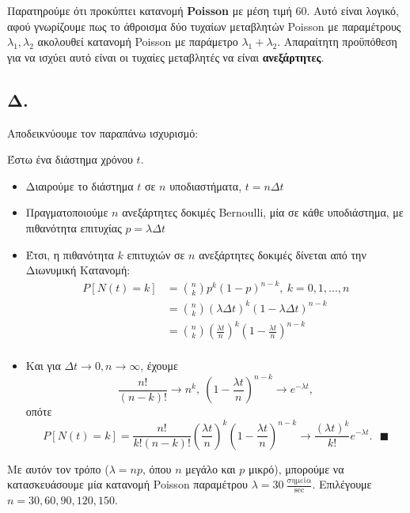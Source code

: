\documentclass[a4paper]{article}
\begin{document}
Παρατηρούμε ότι προκύπτει κατανομή \textbf{Poisson} με μέση τιμή 60. Αυτό είναι λογικό, αφού γνωρίζουμε πως το άθροισμα δύο τυχαίων μεταβλητών Poisson με παραμέτρους $ {λ_1, λ_2} $ ακολουθεί κατανομή Poisson με παράμετρο $ {λ_1 + λ_2} $. Απαραίτητη προϋπόθεση για να ισχύει αυτό είναι οι τυχαίες μεταβλητές να είναι \textbf{ανεξάρτητες}.

\subsection*{Δ.}

Αποδεικνύουμε τον παραπάνω ισχυρισμό:

Έστω ένα διάστημα χρόνου $ t $.

\begin{itemize}
	\item Διαιρούμε το διάστημα $ t $ σε $ n $ υποδιαστήματα, $ {t = nΔt} $
	\item Πραγματοποιούμε $ n $ ανεξάρτητες δοκιμές Bernoulli, μία σε κάθε υποδιάστημα, με πιθανότητα επιτυχίας $ {p = λΔt} $
	\item Έτσι, η πιθανότητα $ k $ επιτυχιών σε $ n $ ανεξάρτητες δοκιμές δίνεται από την Διωνυμική Κατανομή:
	\begin{align*}
		P[N(t) = k] &= \binom{n}{k}p^k(1-p)^{n-k}, \ k = 0,1,...,n \\
						&= \binom{n}{k}(λΔt)^k(1-λΔt)^{n-k} \\
						&= \binom{n}{k}\left(\frac{λt}{n}\right)^k\left(1-\frac{λt}{n} \right)^{n-k} \\			
	\end{align*}
	\item Και για $ Δt \to 0, n \to \infty $, έχουμε 
	\[
		\frac{n!}{(n-k)!} \to n^k, \ \left( 1-\frac{λt}{n}\right)^{n-k} \to e^{-λt},
	\]
	οπότε 
	\[
		P[N(t)=k] = \frac{n!}{k!(n-k)!}\left( \frac{λt}{n}\right)^k \left(1-\frac{λt}{n}\right)^{n-k} \to \frac{(λt)^k}{k!}e^{-λt}. \ \ \ \blacksquare
	\]
\end{itemize} 

Με αυτόν τον τρόπο ($ λ = np $, όπου $ n $ μεγάλο και $ p $ μικρό), μπορούμε να κατασκευάσουμε μία κατανομή Poisson παραμέτρου $ λ = 30 \ \frac{\text{σημεία}}{\text{sec}}$. Επιλέγουμε $ n = 30, 60, 90, 120, 150 $. 
\end{document}

